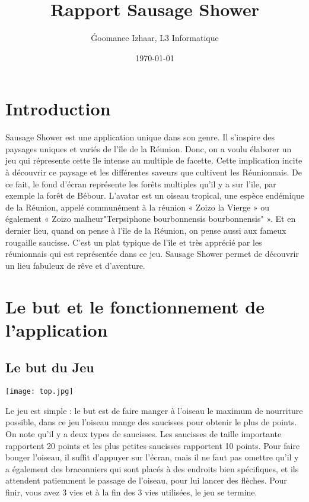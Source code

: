 \documentclass{article}
\title{Rapport Sausage Shower}
\author{\'Goomanee Izhaar, L3 Informatique}
\date{\today}
\begin{document}
\maketitle %


\begin{abstract}
  
\end{abstract}


\section{Introduction}
\label{section:intro} %

 Sausage Shower est une application unique dans son genre. Il s’inspire des paysages uniques et variés de l’île de la Réunion. Donc, on a voulu élaborer un jeu qui répresente cette île intense au multiple de facette. Cette implication incite à découvrir ce paysage et les différentes saveurs que cultivent les Réunionnais. De ce fait, le fond d'écran représente les forêts multiples qu’il y a sur l'ile, par exemple la forêt de Bébour. L'avatar est un oiseau tropical, une espèce endémique de la Réunion, appelé communément à la réunion « Zoizo la Vierge » ou également « Zoizo malheur"Terpsiphone bourbonnensis bourbonnensis" ». 
Et en dernier lieu, quand on pense à l’île de la Réunion, on pense aussi aux fameux rougaille saucisse. C’est un plat typique de l’île et très apprécié par les réunionnais qui est représentée dans ce jeu. 
Sausage Shower permet de découvrir un lieu fabuleux de rêve et d’aventure.


\section{Le but et le fonctionnement de l'application}
\label{section:Le but}


\subsection{ Le but du Jeu}

\begin{center}
  \texttt{[image: top.jpg]}
\end{center}


Le jeu est simple : le but est de faire manger à l’oiseau le maximum de nourriture possible, dans ce jeu l’oiseau mange des saucisses pour obtenir le plus de points. On note qu'il y a deux types de saucisses. Les saucisses de taille importante rapportent 20 points et les plus petites saucisses rapportent 10 points. Pour faire bouger l'oiseau, il suffit d'appuyer sur l'écran, mais il ne faut pas omettre qu'il y a également des braconniers qui sont placés à des endroits bien spécifiques, et ils attendent patiemment le passage de l’oiseau, pour lui lancer des flèches. Pour finir, vous avez 3 vies et à la fin des 3 vies utilisées, le jeu se termine.
\end{document}
